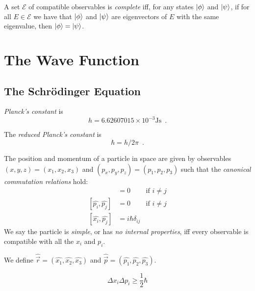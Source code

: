 \begin{df}[Complete]
A set $\mathcal{E}$ of compatible observables is \emph{complete} iff, for any states $\left| {\phi} \right\rangle$ and $\left| {\psi} \right\rangle$, if for all $E \in \mathcal{E}$ we have that $\left| {\phi} \right\rangle$ and $\left| {\psi} \right\rangle$ are eigenvectors of $E$ with the same eigenvalue, then $\left| {\phi} \right\rangle = \left| {\psi} \right\rangle$.
\end{df}

\chapter{The Wave Function}

\section{The Schr\"{o}dinger Equation}

\begin{df}
\emph{Planck's constant} is
\[ h = 6.62607015 \times 10^{-3} \mathrm{Js} \enspace . \]
\end{df}

\begin{df}
The \emph{reduced Planck's constant} is
\[ \hbar = h / 2 \pi \enspace . \]
\end{df}

\begin{ax}
The position and momentum of a particle in space are given by observables $(x,y,z) = (x_1,x_2,x_3)$ and $(p_x,p_y,p_z) = (p_1,p_2,p_3)$ such that the \emph{canonical commutation relations} hold:
\begin{align*}
[\hat{x_i},\hat{x_j}] & = 0 & \text{if } i \neq j \\
[\hat{p_i},\hat{p_j}] & = 0 & \text{if } i \neq j \\
[\hat{x_i},\hat{p_j}] & = i \hbar \delta_{ij}
\end{align*}
We say the particle is \emph{simple}, or has \emph{no internal properties}, iff every observable is compatible with all the $x_i$ and $p_i$.
\end{ax}

\begin{df}
We define $\hat{\vec{r}} = (\hat{x_1},\hat{x_2},\hat{x_3})$ and $\hat{\vec{p}} = (\hat{p_1},\hat{p_2},\hat{p_3})$.
\end{df}

\begin{prop}
\[ \Delta x_i \Delta p_i \geq \frac{1}{2} \hbar \]
\end{prop}

